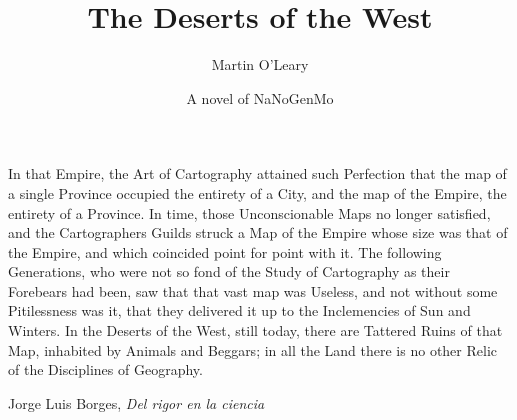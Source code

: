 \documentclass[ebook,10pt]{memoir}
\title{The Deserts of the West}
\author{Martin O'Leary}
\date{A novel of NaNoGenMo}
\begin{document}
\frontmatter

\begin{titlingpage}
\maketitle
\end{titlingpage}

\clearpage
\vspace*{10em}

In that Empire, the Art of Cartography attained such Perfection that the map of
a single Province occupied the entirety of a City, and the map of the Empire,
the entirety of a Province. In time, those Unconscionable Maps no longer
satisfied, and the Cartographers Guilds struck a Map of the Empire whose size
was that of the Empire, and which coincided point for point with it. The
following Generations, who were not so fond of the Study of Cartography as
their Forebears had been, saw that that vast map was Useless, and not without
some Pitilessness was it, that they delivered it up to the Inclemencies of Sun
and Winters. In the Deserts of the West, still today, there are Tattered Ruins
of that Map, inhabited by Animals and Beggars; in all the Land there is no
other Relic of the Disciplines of Geography.

\vspace{1em}
\begin{flushright}
Jorge Luis Borges, \textit{Del rigor en la ciencia}
\end{flushright}

\mainmatter


\end{document}
